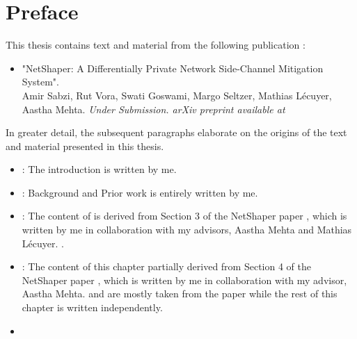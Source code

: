 
\chapter{Preface}

This thesis contains text and material from the following publication \addref:
\begin{itemize}
  \item "NetShaper: A Differentially Private Network Side-Channel Mitigation System".
  \\
  Amir Sabzi, Rut Vora, Swati Goswami, Margo Seltzer, Mathias Lécuyer, Aastha Mehta. \textit{Under Submission. arXiv preprint available at \addref}
\end{itemize}
In greater detail, the subsequent paragraphs elaborate on the origins of the text and material presented in this thesis.
\begin{itemize}
  \item \textbf{}: The introduction is written by me. 
  \item \textbf{}: Background and Prior work is entirely written by me.
  \item \textbf{}: The content of  is derived from Section 3 of the NetShaper paper {\addref}, which is written by me in collaboration with my advisors, Aastha Mehta and Mathias L\'{e}cuyer. .
  \item \textbf{}: The content of this chapter partially derived from Section 4 of the NetShaper paper {\addref}, which is written by me in collaboration with my advisor, Aastha Mehta.  and  are mostly taken from the paper while the rest of this chapter is written independently.
  \item {}
\end{itemize}